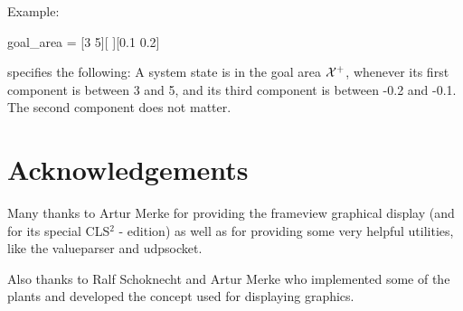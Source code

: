 \documentclass[a4paper,12pt,german]{article}
\newcommand{\cls}{{CLS$^2$ }}
\newcommand{\Xplus}{{${\cal X}^+$}}
\begin{document}
Example:

goal\_area = [3 5][ ][0.1 0.2]

specifies the following: A system state is in the goal area \Xplus, whenever its first component
is between 3 and 5, and its third component is between -0.2 and -0.1. The second component
does not matter.




\section{Acknowledgements}


Many thanks to Artur Merke for providing the frameview graphical display (and for its special
\cls- edition) as well as for providing some very helpful utilities, like the valueparser and udpsocket.

Also thanks to Ralf Schoknecht and Artur Merke who implemented some of the plants and developed
the concept used for displaying graphics.
\end{document}

